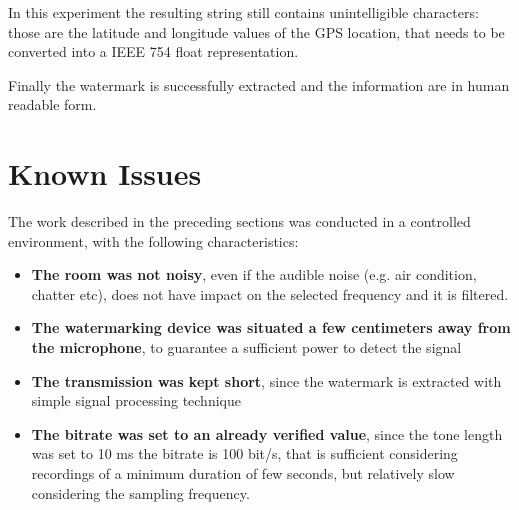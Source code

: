 In this experiment the resulting string still contains unintelligible characters: those are the latitude and longitude values of the GPS location, that needs to be converted into a IEEE 754 float representation.

Finally the watermark is successfully extracted and the information are in human readable form.

\section{Known Issues}
The work described in the preceding sections was conducted in a controlled environment, with the following characteristics:
\begin{itemize}
    \item \textbf{The room was not noisy}, even if the audible noise (e.g. air condition, chatter etc), does not have impact on the selected frequency and it is filtered.
    \item \textbf{The watermarking device was situated a few centimeters away from the microphone}, to guarantee a sufficient power to detect the signal
    \item  \textbf{The transmission was kept short}, since the watermark is extracted with simple signal processing technique
    \item  \textbf{The bitrate was set to an already verified value}, since the tone length was set to 10 ms the bitrate is 100 bit/s, that is sufficient considering recordings of a minimum duration of few seconds, but relatively slow considering the sampling frequency.
\end{itemize}

